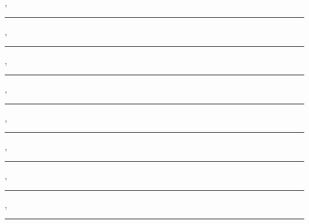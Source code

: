 \vspace*{0.5cm}

\begin{minipage}{0.45\textwidth}
\centering
\singlespacing
{ \advisor\\ \advisorUni \\ \advisorT }
\end{minipage}
\ifnum{}
\hfill
\begin{minipage}{0.45\textwidth}
\centering
\singlespacing
{ \coadvisor\\ \coadvisorUni \\ \coadvisorT }
\end{minipage}
\fi

\vspace*{1cm}

{{\bfseries \signmember}}

\ifnum{}
{ \advisor, \advisorT \\ \advisorUni \hfill\rule{5cm}{1pt} }

{ \memberi, \memberT \\ \memberiUni \hfill\rule{5cm}{1pt} }

{ \memberii, \memberT \\ \memberiiUni \hfill\rule{5cm}{1pt} }

{ \memberiii, \memberT \\ \memberiiiUni \hfill\rule{5cm}{1pt} }

{ \memberiv, \memberT \\ \memberivUni \hfill\rule{5cm}{1pt} }

\else

{ \advisor, \advisorT \\ \advisorUni \hfill\rule{5cm}{1pt} }

{ \memberi, \memberT \\ \memberiUni \hfill\rule{5cm}{1pt} }

{ \memberii, \memberT \\ \memberiiUni \hfill\rule{5cm}{1pt} }

\fi
\fi



